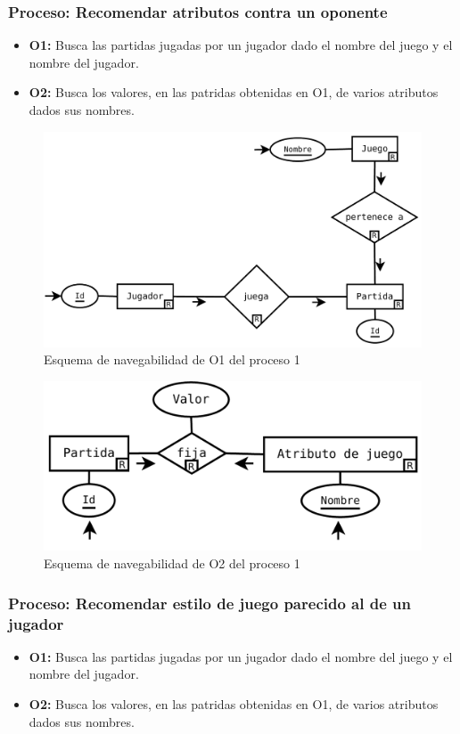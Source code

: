 \subsubsection{Proceso: Recomendar atributos contra un oponente}

\begin{itemize}
	\item \textbf{O1:} Busca las partidas jugadas por un jugador dado el nombre del juego y
		el nombre del jugador.\\

	\item \textbf{O2:} Busca los valores, en las patridas obtenidas
		en O1, de varios atributos dados sus nombres.\\
\end{itemize}

\begin{figure}[h!]
	\centering
	\includegraphics[width=0.5\linewidth]{../Diagramas/pdf/Op1-1.pdf}
	\caption{Esquema de navegabilidad de O1 del proceso 1}
\end{figure}

\begin{figure}[h!]
	\centering
	\includegraphics[width=0.5\linewidth]{../Diagramas/pdf/Op1-2.pdf}
	\caption{Esquema de navegabilidad de O2 del proceso 1}
\end{figure}



\subsubsection{Proceso: Recomendar estilo de juego parecido al de un jugador}

\begin{itemize}
	\item \textbf{O1:} Busca las partidas jugadas por un jugador dado el nombre del juego y
		el nombre del jugador.\\
	\item \textbf{O2:} Busca los valores, en las patridas obtenidas
		en O1, de varios atributos dados sus nombres.\\
\end{itemize}

